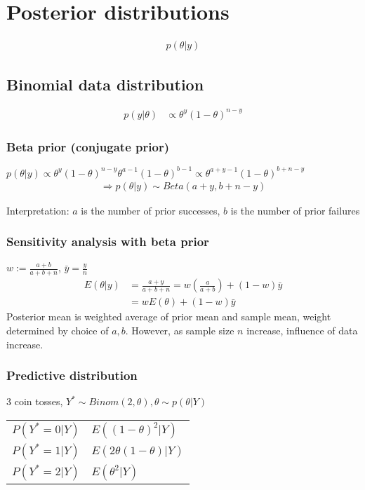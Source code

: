     \section{Posterior distributions}
    \begin{align*}
        p(\theta|y)
    \end{align*}

    \subsection{Binomial data distribution}
    \begin{align*}
        p(y|\theta) &\propto \theta^y (1-\theta)^{n-y}
    \end{align*}

    \subsubsection{Beta prior (conjugate prior)}
    $p(\theta|y) \propto
    \theta^y(1-\theta)^{n-y}\theta^{a-1}(1-\theta)^{b-1}
    \propto \theta^{a+y-1}(1-\theta)^{b+n-y}$
    \begin{align*}
        \Rightarrow p(\theta|y)\sim Beta(a+y, b+n-y)
    \end{align*}

    Interpretation: $a$ is the number of prior successes, 
    $b$ is the number of prior failures

    \subsubsection{Sensitivity analysis with beta prior}

    $w:= \frac{a+b}{a+b+n}$, $\bar y = \frac{y}{n}$
    \begin{align*}
        E(\theta|y) &= \frac{a+y}{a+b+n} = 
        w\left(\frac{a}{a+b}\right) + (1-w)\bar y\\
                    &=wE(\theta) + (1-w)\bar y
    \end{align*}
    Posterior mean is weighted average of prior mean and
    sample mean, weight determined by choice of $a, b$.
    However, as sample size $n$ increase, influence of data
    increase.

    \subsubsection{Predictive distribution}

    3 coin tosses, $Y^*\sim Binom(2, \theta), \theta \sim
    p(\theta|Y)$
    \begin{tabulary}{\linewidth}{l @{ = } l}
        $P(Y^*=0|Y)$ & $E((1-\theta)^2|Y)$\\
        $P(Y^*=1|Y)$ & $E(2\theta(1-\theta)|Y)$\\
        $P(Y^*=2|Y)$ & $E(\theta^2|Y)$
    \end{tabulary}

